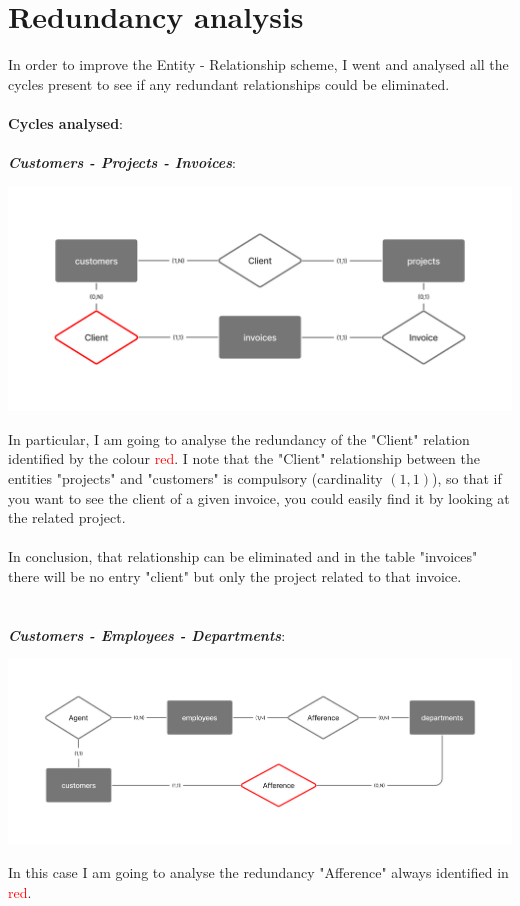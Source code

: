 \documentclass[12pt,a4paper]{article}
\begin{document}
\section{Redundancy analysis}\label{sec:redundancy-analysis}
In order to improve the Entity - Relationship scheme, I went and analysed all the cycles present to see if any redundant relationships could be eliminated.\\
\\
\textbf{Cycles analysed}:\\
\\
\textbf{\textit{Customers - Projects - Invoices}}:
\begin{center}
\includegraphics[width=0.6\columnwidth]{../../img/er_cycle_custumers-projects-invoices}
\end{center}
In particular, I am going to analyse the redundancy of the "Client" relation identified by the colour \textcolor{red}{red}.
I note that the "Client" relationship between the entities "projects" and "customers" is compulsory (cardinality $(1,1)$), so that if you want to see the client of a given invoice, you could easily find it by looking at the related project.\\
\\
In conclusion, that relationship can be eliminated and in the table "invoices" there will be no entry "client" but only the project related to that invoice.\\
\\
\\
\textbf{\textit{Customers - Employees - Departments}}:
\begin{center}
\includegraphics[width=0.6\columnwidth]{../../img/er_cycle_customers-employees-departments}
\end{center}
In this case I am going to analyse the redundancy "Afference" always identified in \textcolor{red}{red}.
\end{document}
